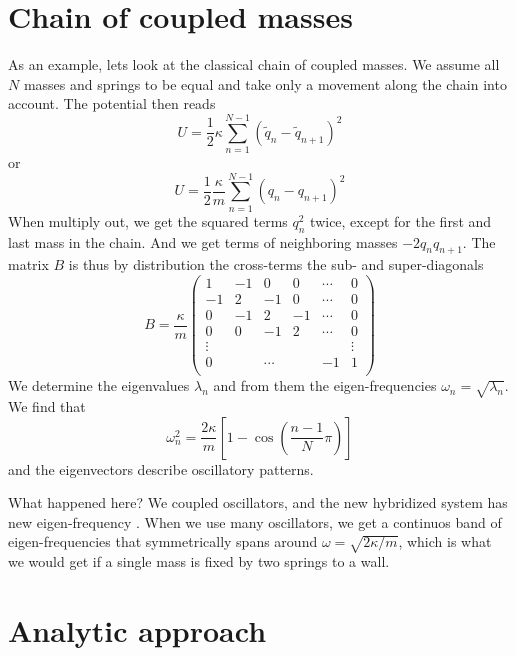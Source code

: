  \section{Chain of coupled masses}

As an example, lets look at the classical chain of coupled masses. We assume all $N$ masses and springs to be equal and take only a movement along the chain into account. The potential then reads
\begin{equation}
    U = \frac{1}{2} \kappa \sum_{n=1}^{N-1} ( \tilde{q}_n - \tilde{q}_{n+1} )^2
\end{equation}
or
\begin{equation}
U = \frac{1}{2} \frac{\kappa}{m} \sum_{n=1}^{N-1}  ( q_n - q_{n+1} )^2
\end{equation}
When multiply out, we get the squared terms $q_n^2$ twice, except for the first and last mass in the chain. And we get terms of neighboring masses $- 2 q_n q_{n+1}$. 
The matrix $B$ is thus by distribution the cross-terms the sub- and super-diagonals 
\begin{equation}
B =\frac{\kappa}{m} \begin{pmatrix}
 1 & -1 & 0 &  0 & \cdots & 0 \\
-1 & 2 & -1 &  0 & \cdots & 0 \\
0  & -1 & 2 &  -1 & \cdots & 0 \\
0 & 0  & -1 & 2 &   \cdots & 0 \\
\vdots  & & &  &  & \vdots \\
0 &   & \cdots    &    & -1 & 1 \\
\end{pmatrix}
\end{equation}
We determine the eigenvalues $\lambda_n$ and from them the eigen-frequencies $\omega_n = \sqrt{\lambda_n}$. We find that
\begin{equation}
  \omega_n^2 = \frac{2 \kappa}{m} \left[ 1 - \cos \left(\frac{n-1}{N} \pi \right) \right] 
  \label{eq:5_omega_diag}
\end{equation}
and the eigenvectors describe oscillatory patterns.


What happened here? We coupled oscillators, and the new hybridized system has new eigen-frequency . When we use many oscillators, we get a continuos band of eigen-frequencies that symmetrically spans around $\omega = \sqrt{2 \kappa / m}$, which is what we would get if a single mass is fixed by two springs to a wall.




\section{Analytic approach}

